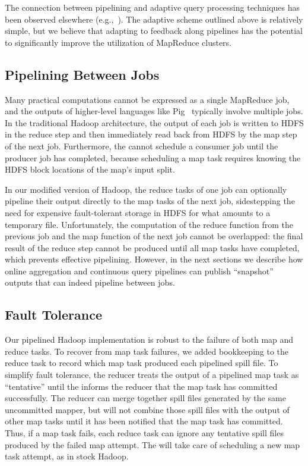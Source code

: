 The connection between pipelining and adaptive query processing techniques has
been observed elsewhere (e.g.,~\cite{eddies}). The adaptive scheme outlined
above is relatively simple, but we believe that adapting to feedback along
pipelines has the potential to significantly improve the utilization of
MapReduce clusters.

\subsection{Pipelining Between Jobs}
\label{ch:hop:sec:inter-pipe}

Many practical computations cannot be expressed as a single MapReduce job, and
the outputs of higher-level languages like Pig~\cite{pig} typically involve
multiple jobs.  In the traditional Hadoop architecture, the output of each job
is written to HDFS in the reduce step and then immediately read back from HDFS
by the map step of the next job. Furthermore, the {\JT} cannot schedule a
consumer job until the producer job has completed, because scheduling a map task
requires knowing the HDFS block locations of the map's input split.

In our modified version of Hadoop, the reduce tasks of one job can optionally
pipeline their output directly to the map tasks of the next job, sidestepping
the need for expensive fault-tolerant storage in HDFS for what amounts to a
temporary file. Unfortunately, the computation of the reduce function from the
previous job and the map function of the next job cannot be overlapped: the
final result of the reduce step cannot be produced until all map tasks have
completed, which prevents effective pipelining. However, in the next sections we
describe how online aggregation and continuous query pipelines can publish
``snapshot'' outputs that can indeed pipeline between jobs.

\subsection{Fault Tolerance}
\label{ch:hop:sec:ft}


Our pipelined Hadoop implementation is robust to the failure of both
map and reduce tasks. To recover from map task failures, we added
bookkeeping to the reduce task to record which map task produced each
pipelined spill file. To simplify fault tolerance, the reducer treats
the output of a pipelined map task as ``tentative'' until the {\JT}
informs the reducer that the map task has committed successfully. The
reducer can merge together spill files generated by the same
uncommitted mapper, but will not combine those spill files with the
output of other map tasks until it has been notified that the map task
has committed. Thus, if a map task fails, each reduce task can ignore
any tentative spill files produced by the failed map attempt. The
{\JT} will take care of scheduling a new map task attempt, as in stock
Hadoop. 

